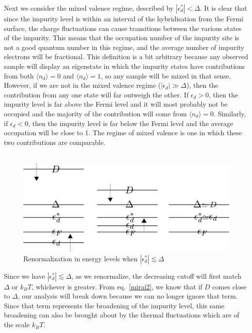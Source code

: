 \documentclass[twoside]{report}
\numberwithin{equation}{section}
\begin{document}
Next we consider the mixed valence regime, described by \(|\epsilon_d^*| < \Delta\).
It is clear that since the impurity level is within an interval of the hybridisation from the Fermi surface, the charge fluctuations can cause transitions between the various states of the impurity.
This means that the occupation number of the impurity site is not a good quantum number in this regime, and the average number of impurity electrons will be fractional.
This definition is a bit arbitrary because any observed sample will display an eigenstate in which the impurity states have contributions from both \(\langle  n_d\rangle=0\) and \(\langle  n_d\rangle=1\), so any sample will be mixed in that sense.
However, if we are not in the mixed valence regime (\(|\epsilon_d| \gg \Delta\)), then the contribution from any one state will far outweigh the other.
If \(\epsilon_d > 0\), then the impurity level is far above the Fermi level and it will most probably not be occupied and the majority of the contribution will come from \(\langle  n_d\rangle = 0\).
Similarly, if \(\epsilon_d < 0\), then the impurity level is far below the Fermi level and the average occupation will be close to 1.
The regime of mixed valence is one in which these two contributions are comparable.
\\\\
\begin{figure} \centering \includegraphics[scale=0.29]{../figures/mixed.png}\caption{Renormalization in energy levels when \(|\epsilon_d^*| \lesssim \Delta\)} \end{figure}
Since we have \(|\epsilon_d^*| \lesssim \Delta\), as we renormalize, the decreasing cutoff will first match \(\Delta\) or \(k_B T\), whichever is greater.
From eq.~\ref{mirai2}, we know that if \(D\) comes close to \(\Delta\), our analysis will break down because we can no longer ignore that term.
Since that term represents the broadening of the impurity level, this same broadening can also be brought about by the thermal fluctuations which are of the scale \(k_B T\).
\end{document}
